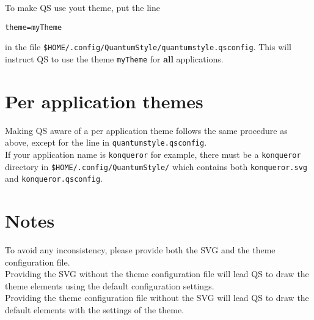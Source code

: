 \documentclass[a4paper,12pt]{report}
\begin{document}
To make QS use yout theme, put the line

\begin{verbatim}
theme=myTheme
\end{verbatim}

in the file \verb,$HOME/.config/QuantumStyle/quantumstyle.qsconfig,. This will
instruct QS to use the theme \verb,myTheme, for \textbf{all} applications.

\section{Per application themes}
Making QS aware of a per application theme follows the same procedure as above,
except for the line in \verb,quantumstyle.qsconfig,.\\

If your application name is \verb,konqueror, for example, there must be a
\verb,konqueror, directory in \verb,$HOME/.config/QuantumStyle/, which contains
both \verb,konqueror.svg, and \verb,konqueror.qsconfig,.

\section{Notes}
To avoid any inconsistency, please provide both the SVG and the theme
configuration file.\\
Providing the SVG without the theme configuration file
will lead QS to draw the theme elements using the default configuration
settings.\\
Providing the theme configuration file without the SVG will lead QS to
draw the default elements with the settings of the theme.
\end{document}
